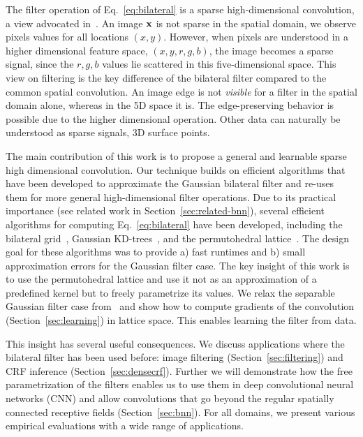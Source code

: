The filter operation of Eq.~\ref{eq:bilateral} is a sparse high-dimensional convolution,
a view advocated in~\cite{barash2002fundamental,paris2006fast}. An image $\mathbf{x}$ is
not sparse in the spatial domain, we observe pixels values for all locations $(x,y)$. However, when
pixels are understood in a higher dimensional feature space, \eg $(x,y,r,g,b)$, the image becomes a sparse signal,
since the $r,g,b$ values lie scattered in this five-dimensional space.
This view on filtering is the key difference of the bilateral filter compared to the common spatial convolution.
An image edge is not \emph{visible} for a filter in the spatial domain alone, whereas in the 5D space it is.
The edge-preserving behavior is possible due to the higher dimensional operation. Other data can naturally
be understood as sparse signals, \eg 3D surface points.

The main contribution of this work is to propose a general and learnable sparse high dimensional convolution.
Our technique builds on efficient algorithms
that have been developed to approximate the Gaussian bilateral filter and re-uses them for
more general high-dimensional filter operations. Due to its practical importance (see related work in
Section~\ref{sec:related-bnn}), several efficient algorithms for computing Eq.~\ref{eq:bilateral}
have been developed, including the bilateral grid~\cite{paris2006fast}, Gaussian
KD-trees~\cite{adams2009gaussian}, and the permutohedral
lattice~\cite{adams2010fast}. The design goal for these algorithms was to provide a) fast runtimes and b) small
approximation errors for
the Gaussian filter case. The key insight of this work is to use the permutohedral lattice and use it not as
an approximation of a predefined kernel but to freely parametrize its values. We relax the separable Gaussian
filter case from~\cite{adams2010fast} and show
how to compute gradients of the convolution (Section~\ref{sec:learning}) in lattice space. This enables learning
the filter from data.

This insight has several useful consequences. We discuss applications where the bilateral filter has been used
before: image filtering (Section~\ref{sec:filtering}) and CRF inference (Section~\ref{sec:densecrf}). Further we will demonstrate how the
free parametrization of the filters enables us to use them in deep convolutional neural networks (CNN) and allow convolutions that go beyond the regular
spatially connected receptive fields (Section~\ref{sec:bnn}). For all domains, we present various empirical evaluations with
a wide range of applications.

